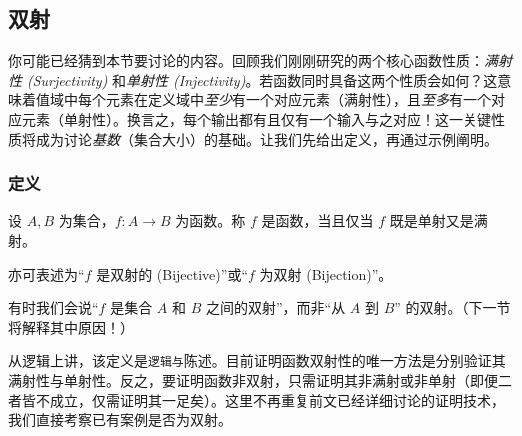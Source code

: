
\subsection{双射}

你可能已经猜到本节要讨论的内容。回顾我们刚刚研究的两个核心函数性质：\emph{满射性 (Surjectivity)} 和\emph{单射性 (Injectivity)}。若函数同时具备这两个性质会如何？这意味着值域中每个元素在定义域中\emph{至少}有一个对应元素（满射性），且\emph{至多}有一个对应元素（单射性）。换言之，每个输出都有且仅有一个输入与之对应！这一关键性质将成为讨论\emph{基数}（集合大小）的基础。让我们先给出定义，再通过示例阐明。

\subsubsection*{定义}

\begin{definition}
    设 $A, B$ 为集合，$f: A \to B$ 为函数。称 $f$ 是函数，当且仅当 $f$ 既是单射又是满射。

    亦可表述为``$f$ 是双射的 (Bijective)''或``$f$ 为双射 (Bijection)''。

    有时我们会说``$f$ 是集合 $A$ 和 $B$ 之间的双射''，而非``从 $A$ 到 $B$'' 的双射。（下一节将解释其中原因！）
\end{definition}

从逻辑上讲，该定义是\verb|逻辑与|陈述。目前证明函数双射性的唯一方法是分别验证其满射性与单射性。反之，要证明函数非双射，只需证明其非满射或非单射（即便二者皆不成立，仅需证明其一足矣）。这里不再重复前文已经详细讨论的证明技术，我们直接考察已有案例是否为双射。

